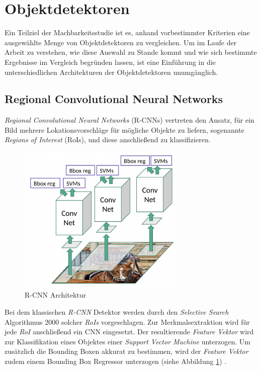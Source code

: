 \section{Objektdetektoren}

Ein Teilziel der Machbarkeitsstudie ist es, anhand vorbestimmter Kriterien eine ausgewählte Menge von Objektdetektoren zu vergleichen. Um im Laufe der Arbeit zu verstehen, wie diese Auswahl zu Stande kommt und wie sich bestimmte Ergebnisse im Vergleich begründen lassen, ist eine Einführung in die unterschiedlichen Architekturen der Objektdetektoren unumgänglich. 

\subsection*{Regional Convolutional Neural Networks}

\textit{Regional Convolutional Neural Networks} (R-CNNs) vertreten den Ansatz, für ein Bild mehrere Lokationsvorschläge für mögliche Objekte zu liefern, sogenannte \textit{Regions of Interest} (RoIs), und diese anschließend zu klassifizieren. 

\begin{figure}[ht]
	\begin{center}
		\includegraphics[width=8cm]{Bilder/rcnn.png} 
		\caption[R-CNN Architektur]{R-CNN Architektur \cite{RohithGandhi.20180709}}
		\label{rcnn}
	\end{center}
\end{figure}

Bei dem klassischen \textit{R-CNN} Detektor werden durch den \textit{Selective Search} Algorithmus 2000 solcher \textit{RoIs} vorgeschlagen. Zur Merkmalsextraktion wird für jede \textit{RoI} anschließend ein CNN eingesetzt. Der resultierende \textit{Feature Vektor} wird zur Klassifikation eines Objektes einer \textit{Support Vector Machine} unterzogen. Um zusätzlich die Bounding Boxen akkurat zu bestimmen, wird der \textit{Feature Vektor} zudem einem Bounding Box Regressor unterzogen (siehe Abbildung \ref{rcnn}) \cite{RohithGandhi.20180709}. 

